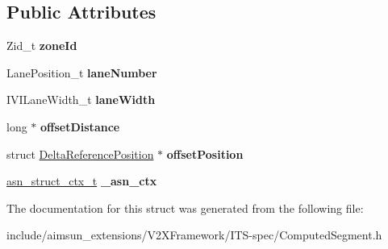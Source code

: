 \subsection*{Public Attributes}
\begin{DoxyCompactItemize}
\item 
Zid\+\_\+t {\bfseries zone\+Id}\hypertarget{structComputedSegment_a4740feb45a20e11085c45ae27588b61a}{}\label{structComputedSegment_a4740feb45a20e11085c45ae27588b61a}

\item 
Lane\+Position\+\_\+t {\bfseries lane\+Number}\hypertarget{structComputedSegment_a00ded335eea383e6a1d9118d984a1464}{}\label{structComputedSegment_a00ded335eea383e6a1d9118d984a1464}

\item 
I\+V\+I\+Lane\+Width\+\_\+t {\bfseries lane\+Width}\hypertarget{structComputedSegment_a987998a435163b01cfdf8a4dd7a7bec4}{}\label{structComputedSegment_a987998a435163b01cfdf8a4dd7a7bec4}

\item 
long $\ast$ {\bfseries offset\+Distance}\hypertarget{structComputedSegment_af09f6a29e1f74f89f0c9a36b2f50df01}{}\label{structComputedSegment_af09f6a29e1f74f89f0c9a36b2f50df01}

\item 
struct \hyperlink{structDeltaReferencePosition}{Delta\+Reference\+Position} $\ast$ {\bfseries offset\+Position}\hypertarget{structComputedSegment_a1f1dfd0ba0ee3edece67a09a4b634bd0}{}\label{structComputedSegment_a1f1dfd0ba0ee3edece67a09a4b634bd0}

\item 
\hyperlink{structasn__struct__ctx__s}{asn\+\_\+struct\+\_\+ctx\+\_\+t} {\bfseries \+\_\+asn\+\_\+ctx}\hypertarget{structComputedSegment_acb3b847de0c71b06ec0146efaaa2d5af}{}\label{structComputedSegment_acb3b847de0c71b06ec0146efaaa2d5af}

\end{DoxyCompactItemize}


The documentation for this struct was generated from the following file\+:\begin{DoxyCompactItemize}
\item 
include/aimsun\+\_\+extensions/\+V2\+X\+Framework/\+I\+T\+S-\/spec/Computed\+Segment.\+h\end{DoxyCompactItemize}
